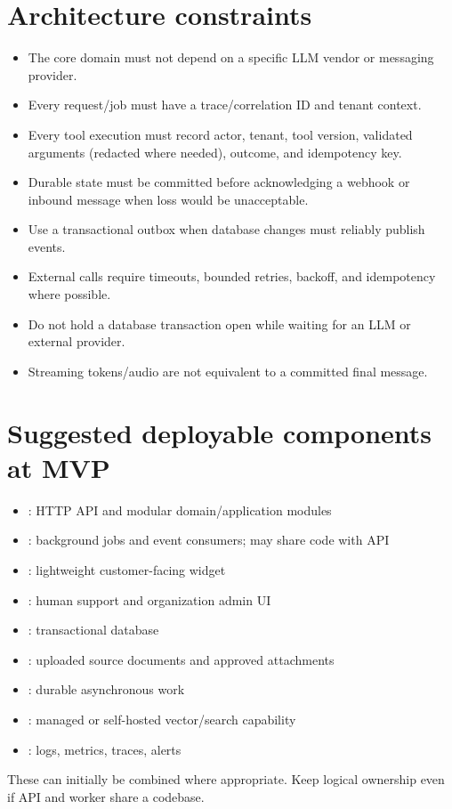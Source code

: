 \section{Architecture constraints}

\begin{itemize}
\item The core domain must not depend on a specific LLM vendor or messaging provider.
\item Every request/job must have a trace/correlation ID and tenant context.
\item Every tool execution must record actor, tenant, tool version, validated arguments (redacted where needed), outcome, and idempotency key.
\item Durable state must be committed before acknowledging a webhook or inbound message when loss would be unacceptable.
\item Use a transactional outbox when database changes must reliably publish events.
\item External calls require timeouts, bounded retries, backoff, and idempotency where possible.
\item Do not hold a database transaction open while waiting for an LLM or external provider.
\item Streaming tokens/audio are not equivalent to a committed final message.
\end{itemize}
\section{Suggested deployable components at MVP}

\begin{itemize}
\item {}: HTTP API and modular domain/application modules
\item {}: background jobs and event consumers; may share code with API
\item {}: lightweight customer-facing widget
\item {}: human support and organization admin UI
\item {}: transactional database
\item {}: uploaded source documents and approved attachments
\item {}: durable asynchronous work
\item {}: managed or self-hosted vector/search capability
\item {}: logs, metrics, traces, alerts
\end{itemize}
These can initially be combined where appropriate. Keep logical ownership even if API and worker share a codebase.

